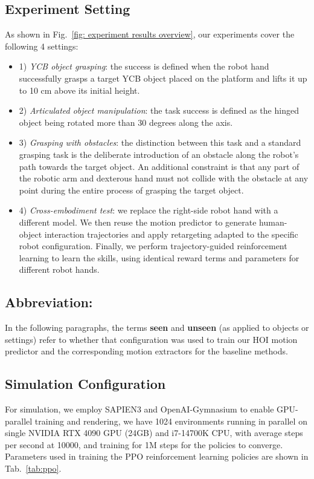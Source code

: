 \documentclass[letterpaper]{article}
\begin{document}
\subsection{Experiment Setting}
As shown in Fig.~\ref{fig: experiment results overview}, our experiments cover the following 4 settings:
\begin{itemize}
    \item 1) \textit{YCB object grasping}: the success is defined when the robot hand successfully grasps a target YCB object placed on the platform and lifts it up to 10 cm above its initial height.
    \item 2) \textit{Articulated object manipulation}: the task success is defined as the hinged object being rotated more than 30 degrees along the axis.
    \item 3) \textit{Grasping with obstacles}: the distinction between this task and a standard grasping task is the deliberate introduction of an obstacle along the robot's path towards the target object. An additional constraint is that any part of the robotic arm and dexterous hand must not collide with the obstacle at any point during the entire process of grasping the target object.
    \item 4) \textit{Cross-embodiment test}: we replace the right-side robot hand with a different model. We then reuse the motion predictor to generate human-object interaction trajectories and apply retargeting adapted to the specific robot configuration. Finally, we perform trajectory-guided reinforcement learning to learn the skills, using identical reward terms and parameters for different robot hands.
\end{itemize}

\subsection{Abbreviation:} In the following paragraphs, the terms \textbf{seen} and \textbf{unseen} (as applied to objects or settings) refer to whether that configuration was used to train our HOI motion predictor and the corresponding motion extractors for the baseline methods.
\subsection{Simulation Configuration}For simulation, we employ SAPIEN3 \cite{xiang2020sapien} and OpenAI-Gymnasium \cite{towers2024gymnasium} to enable GPU-parallel training and rendering, we have 1024 environments running in parallel on single NVIDIA RTX 4090 GPU (24GB) and i7-14700K CPU, with average steps per second at 10000, and training for 1M steps for the policies to converge. Parameters used in training the PPO reinforcement learning policies are shown in Tab.~\ref{tab:ppo}.
\end{document}
